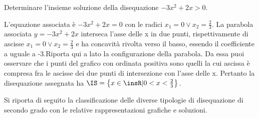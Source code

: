 \begin{esempio}
Determinare l'insieme soluzione della disequazione $-3x^2+2x>0$.

L'equazione associata è $-3x^2+2x=0$ con le radici $x_1=0\vee x_2=\frac 2 3$. 
La parabola associata $y=-3x^2+2x$ interseca l'asse delle x in due punti, 
rispettivamente di ascisse $x_1=0\vee x_2=\frac 2 3$ e ha concavità rivolta 
verso il basso, essendo il coefficiente a uguale a -3.Riporta qui a lato la 
configurazione della parabola.
Da essa puoi osservare che i punti del grafico con ordinata positiva sono 
quelli 
la cui ascissa è compresa fra le ascisse dei due punti di intersezione con 
l'asse delle x.
Pertanto la disequazione assegnata ha $\IS=\left\{x\in \insR | 0<x<\frac 2 
3\right\}$.
\end{esempio}


Si riporta di seguito la classificazione delle diverse 
tipologie di disequazione di secondo grado con le relative rappresentazioni 
grafiche e soluzioni.

% 

\begin{inaccessibleblock}
\end{inaccessibleblock}

{\centering

\vspace{12pt}

\vspace{12pt}

\vspace{12pt}

\vspace{12pt}

\vspace{12pt}

}

